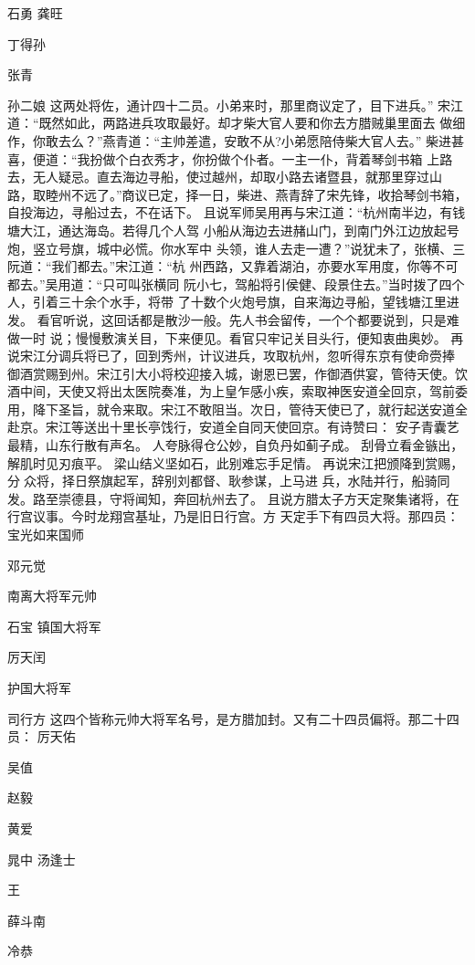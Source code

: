 石勇
龚旺

丁得孙

张青

孙二娘
这两处将佐，通计四十二员。小弟来时，那里商议定了，目下进兵。”
宋江道：“既然如此，两路进兵攻取最好。却才柴大官人要和你去方腊贼巢里面去
做细作，你敢去么？”燕青道：“主帅差遣，安敢不从?小弟愿陪侍柴大官人去。”
柴进甚喜，便道：“我扮做个白衣秀才，你扮做个仆者。一主一仆，背着琴剑书箱
上路去，无人疑忌。直去海边寻船，使过越州，却取小路去诸暨县，就那里穿过山
路，取睦州不远了。”商议已定，择一日，柴进、燕青辞了宋先锋，收拾琴剑书箱，
自投海边，寻船过去，不在话下。
且说军师吴用再与宋江道：“杭州南半边，有钱塘大江，通达海岛。若得几个人驾
小船从海边去进赭山门，到南门外江边放起号炮，竖立号旗，城中必慌。你水军中
头领，谁人去走一遭？”说犹未了，张横、三阮道：“我们都去。”宋江道：“杭
州西路，又靠着湖泊，亦要水军用度，你等不可都去。”吴用道：“只可叫张横同
阮小七，驾船将引侯健、段景住去。”当时拨了四个人，引着三十余个水手，将带
了十数个火炮号旗，自来海边寻船，望钱塘江里进发。
看官听说，这回话都是散沙一般。先人书会留传，一个个都要说到，只是难做一时
说；慢慢敷演关目，下来便见。看官只牢记关目头行，便知衷曲奥妙。
再说宋江分调兵将已了，回到秀州，计议进兵，攻取杭州，忽听得东京有使命赍捧
御酒赏赐到州。宋江引大小将校迎接入城，谢恩已罢，作御酒供宴，管待天使。饮
酒中间，天使又将出太医院奏准，为上皇乍感小疾，索取神医安道全回京，驾前委
用，降下圣旨，就令来取。宋江不敢阻当。次日，管待天使已了，就行起送安道全
赴京。宋江等送出十里长亭饯行，安道全自同天使回京。有诗赞曰：
安子青囊艺最精，山东行散有声名。
人夸脉得仓公妙，自负丹如蓟子成。
刮骨立看金镞出，解肌时见刃痕平。
梁山结义坚如石，此别难忘手足情。
再说宋江把颁降到赏赐，分众将，择日祭旗起军，辞别刘都督、耿参谋，上马进
兵，水陆并行，船骑同发。路至崇德县，守将闻知，奔回杭州去了。
且说方腊太子方天定聚集诸将，在行宫议事。今时龙翔宫基址，乃是旧日行宫。方
天定手下有四员大将。那四员：
宝光如来国师

邓元觉

南离大将军元帅

石宝
镇国大将军

厉天闰

护国大将军

司行方
这四个皆称元帅大将军名号，是方腊加封。又有二十四员偏将。那二十四员：
厉天佑

吴值

赵毅

黄爱

晁中
汤逢士

王

薛斗南

冷恭

